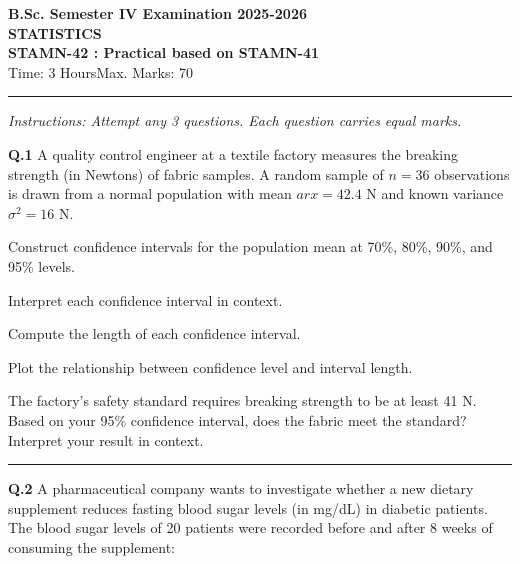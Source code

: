 \documentclass[11pt,a4paper]{article}
\begin{document}
\begin{center}
  {\large\bfseries B.Sc. Semester IV Examination 2025-2026}\\[4pt]
  {\large\bfseries STATISTICS}\\[4pt]
  {\large\bfseries STAMN-42 : Practical based on STAMN-41}\\[4pt]
  {\normalsize Time: 3 Hours\hfill Max. Marks: 70}
\end{center}

\rule{\linewidth}{0.4pt}\smallskip



\noindent   \textit{Instructions: Attempt any 3 questions. Each question carries equal marks.}
\bigskip




\noindent   \textbf{Q.1} A quality control engineer at a textile factory measures the breaking strength (in Newtons) of fabric samples. A random sample of $n = 36$ observations is drawn from a normal population with mean $ar{x} = 42.4 \text{ N}$ and known variance $\sigma^2 = 16 \text{ N}$.


\begin{parts}
  \item Construct confidence intervals for the population mean at 70\%, 80\%, 90\%, and 95\% levels.
  \item Interpret each confidence interval in context.
  \item Compute the length of each confidence interval.
  \item Plot the relationship between confidence level and interval length.
  \item The factory's safety standard requires breaking strength to be at least 41 N. Based on your 95\% confidence interval, does the fabric meet the standard? Interpret your result in context.
\end{parts}

\medskip\rule{\linewidth}{0.2pt}\medskip




\noindent   \textbf{Q.2} A pharmaceutical company wants to investigate whether a new dietary supplement reduces fasting blood sugar levels (in mg/dL) in diabetic patients. The blood sugar levels of 20 patients were recorded before and after 8 weeks of consuming the supplement:
\end{document}
